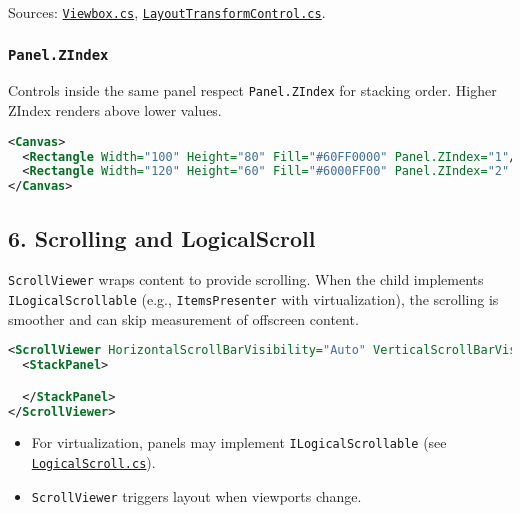 Sources:
\href{https://github.com/AvaloniaUI/Avalonia/blob/master/src/Avalonia.Controls/Viewbox.cs}{\passthrough{\lstinline!Viewbox.cs!}},
\href{https://github.com/AvaloniaUI/Avalonia/blob/master/src/Avalonia.Controls/LayoutTransformControl.cs}{\passthrough{\lstinline!LayoutTransformControl.cs!}}.

\subsubsection{\texorpdfstring{\texttt{Panel.ZIndex}}{Panel.ZIndex}}\label{panel.zindex}

Controls inside the same panel respect
\passthrough{\lstinline!Panel.ZIndex!} for stacking order. Higher ZIndex
renders above lower values.

\begin{lstlisting}[language=XML]
<Canvas>
  <Rectangle Width="100" Height="80" Fill="#60FF0000" Panel.ZIndex="1"/>
  <Rectangle Width="120" Height="60" Fill="#6000FF00" Panel.ZIndex="2" Margin="20,10,0,0"/>
</Canvas>
\end{lstlisting}

\subsection{6. Scrolling and
LogicalScroll}\label{scrolling-and-logicalscroll}

\passthrough{\lstinline!ScrollViewer!} wraps content to provide
scrolling. When the child implements
\passthrough{\lstinline!ILogicalScrollable!} (e.g.,
\passthrough{\lstinline!ItemsPresenter!} with virtualization), the
scrolling is smoother and can skip measurement of offscreen content.

\begin{lstlisting}[language=XML]
<ScrollViewer HorizontalScrollBarVisibility="Auto" VerticalScrollBarVisibility="Auto">
  <StackPanel>

  </StackPanel>
</ScrollViewer>
\end{lstlisting}

\begin{itemize}
\tightlist
\item
  For virtualization, panels may implement
  \passthrough{\lstinline!ILogicalScrollable!} (see
  \href{https://github.com/AvaloniaUI/Avalonia/blob/master/src/Avalonia.Controls/LogicalScroll.cs}{\passthrough{\lstinline!LogicalScroll.cs!}}).
\item
  \passthrough{\lstinline!ScrollViewer!} triggers layout when viewports
  change.
\end{itemize}

